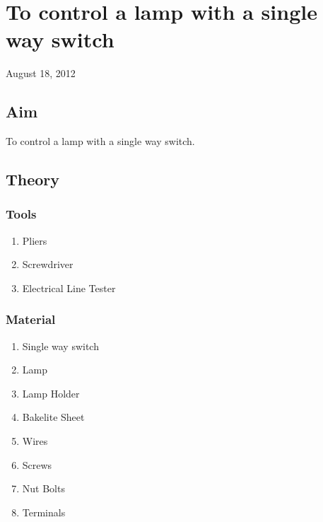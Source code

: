 \chapter{To control a lamp with a single way switch}
\begin{flushright}
August 18, 2012
\end{flushright}
\section{Aim}
To control a lamp with a single way switch.

\section{Theory}
	\subsection {Tools}
		\begin{enumerate}
			\item Pliers
			\item Screwdriver
			\item Electrical Line Tester
		\end{enumerate}
	\subsection {Material}
		\begin{enumerate}
			\item Single way switch
			\item Lamp
			\item Lamp Holder
			\item Bakelite Sheet
			\item Wires
			\item Screws
			\item Nut Bolts
			\item Terminals
		\end{enumerate}

